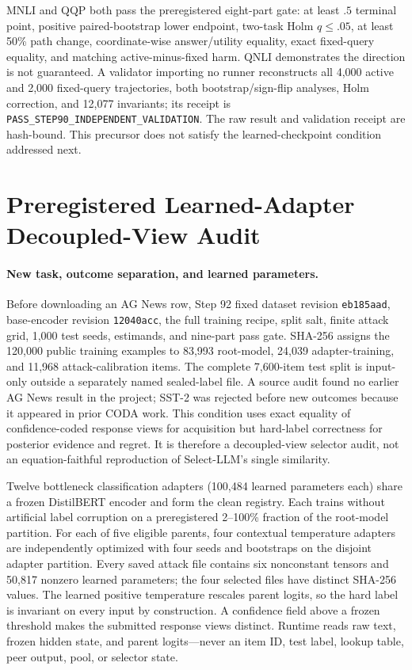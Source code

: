 

MNLI and QQP both pass the preregistered eight-part gate: at least $.5$ terminal point, positive paired-bootstrap lower endpoint, two-task Holm $q\leq.05$, at least 50\% path change, coordinate-wise answer/utility equality, exact fixed-query equality, and matching active-minus-fixed harm. QNLI demonstrates the direction is not guaranteed. A validator importing no runner reconstructs all 4,000 active and 2,000 fixed-query trajectories, both bootstrap/sign-flip analyses, Holm correction, and 12,077 invariants; its receipt is \texttt{PASS\_STEP90\_INDEPENDENT\_VALIDATION}. The raw result and validation receipt are hash-bound. This precursor does not satisfy the learned-checkpoint condition addressed next.

\section{Preregistered Learned-Adapter Decoupled-View Audit}
\label{app:step92}

\paragraph{New task, outcome separation, and learned parameters.}
Before downloading an AG News row, Step 92 fixed dataset revision \texttt{eb185aad}, base-encoder revision \texttt{12040acc}, the full training recipe, split salt, finite attack grid, 1,000 test seeds, estimands, and nine-part pass gate. SHA-256 assigns the 120,000 public training examples to 83,993 root-model, 24,039 adapter-training, and 11,968 attack-calibration items. The complete 7,600-item test split is input-only outside a separately named sealed-label file. A source audit found no earlier AG News result in the project; SST-2 was rejected before new outcomes because it appeared in prior CODA work. This condition uses exact equality of confidence-coded response views for acquisition but hard-label correctness for posterior evidence and regret. It is therefore a decoupled-view selector audit, not an equation-faithful reproduction of Select-LLM's single similarity.

Twelve bottleneck classification adapters (100,484 learned parameters each) share a frozen DistilBERT encoder and form the clean registry. Each trains without artificial label corruption on a preregistered 2--100\% fraction of the root-model partition. For each of five eligible parents, four contextual temperature adapters are independently optimized with four seeds and bootstraps on the disjoint adapter partition. Every saved attack file contains six nonconstant tensors and 50,817 nonzero learned parameters; the four selected files have distinct SHA-256 values. The learned positive temperature rescales parent logits, so the hard label is invariant on every input by construction. A confidence field above a frozen threshold makes the submitted response views distinct. Runtime reads raw text, frozen hidden state, and parent logits---never an item ID, test label, lookup table, peer output, pool, or selector state.

